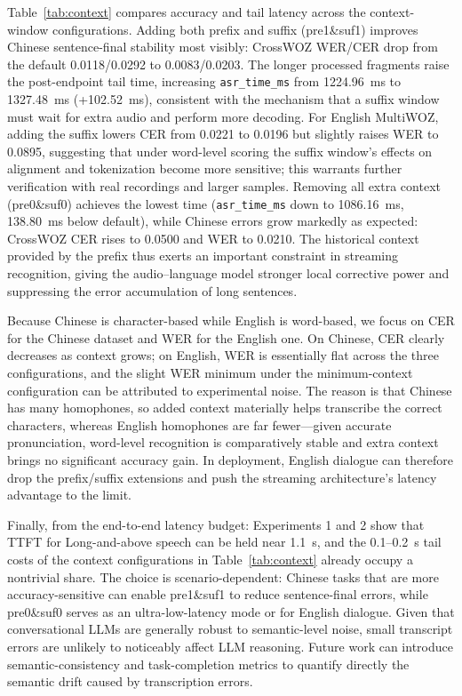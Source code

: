 \documentclass[conference]{IEEEtran}
\begin{document}
Table~\ref{tab:context} compares accuracy and tail latency across the context-window configurations. Adding both prefix and suffix (pre1\&suf1) improves Chinese sentence-final stability most visibly: CrossWOZ WER/CER drop from the default 0.0118/0.0292 to 0.0083/0.0203. The longer processed fragments raise the post-endpoint tail time, increasing \texttt{asr\_time\_ms} from 1224.96~ms to 1327.48~ms (+102.52~ms), consistent with the mechanism that a suffix window must wait for extra audio and perform more decoding. For English MultiWOZ, adding the suffix lowers CER from 0.0221 to 0.0196 but slightly raises WER to 0.0895, suggesting that under word-level scoring the suffix window's effects on alignment and tokenization become more sensitive; this warrants further verification with real recordings and larger samples. Removing all extra context (pre0\&suf0) achieves the lowest time (\texttt{asr\_time\_ms} down to 1086.16~ms, 138.80~ms below default), while Chinese errors grow markedly as expected: CrossWOZ CER rises to 0.0500 and WER to 0.0210. The historical context provided by the prefix thus exerts an important constraint in streaming recognition, giving the audio--language model stronger local corrective power and suppressing the error accumulation of long sentences.

Because Chinese is character-based while English is word-based, we focus on CER for the Chinese dataset and WER for the English one. On Chinese, CER clearly decreases as context grows; on English, WER is essentially flat across the three configurations, and the slight WER minimum under the minimum-context configuration can be attributed to experimental noise. The reason is that Chinese has many homophones, so added context materially helps transcribe the correct characters, whereas English homophones are far fewer---given accurate pronunciation, word-level recognition is comparatively stable and extra context brings no significant accuracy gain. In deployment, English dialogue can therefore drop the prefix/suffix extensions and push the streaming architecture's latency advantage to the limit.

Finally, from the end-to-end latency budget: Experiments 1 and 2 show that TTFT for Long-and-above speech can be held near 1.1~s, and the 0.1--0.2~s tail costs of the context configurations in Table~\ref{tab:context} already occupy a nontrivial share. The choice is scenario-dependent: Chinese tasks that are more accuracy-sensitive can enable pre1\&suf1 to reduce sentence-final errors, while pre0\&suf0 serves as an ultra-low-latency mode or for English dialogue. Given that conversational LLMs are generally robust to semantic-level noise, small transcript errors are unlikely to noticeably affect LLM reasoning. Future work can introduce semantic-consistency and task-completion metrics to quantify directly the semantic drift caused by transcription errors.
\end{document}
